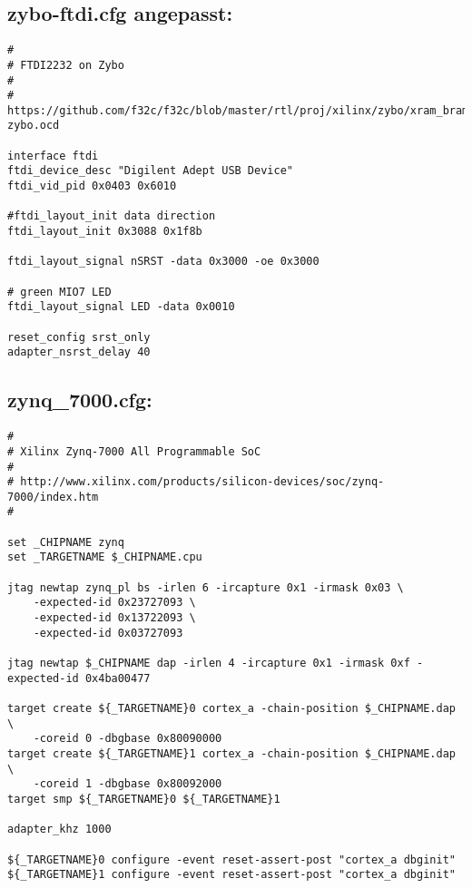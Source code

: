 \subsection{zybo-ftdi.cfg angepasst:}
\label{anhang:zybo-ftdi.cfg}
\lstset{language=tcl}
\begin{lstlisting}
#
# FTDI2232 on Zybo
#
#  https://github.com/f32c/f32c/blob/master/rtl/proj/xilinx/zybo/xram_bram_hdmi_ise/ftdi-zybo.ocd 

interface ftdi
ftdi_device_desc "Digilent Adept USB Device"
ftdi_vid_pid 0x0403 0x6010

#ftdi_layout_init data direction
ftdi_layout_init 0x3088 0x1f8b

ftdi_layout_signal nSRST -data 0x3000 -oe 0x3000

# green MIO7 LED
ftdi_layout_signal LED -data 0x0010

reset_config srst_only
adapter_nsrst_delay 40
\end{lstlisting}



\subsection{zynq\_7000.cfg:}
\label{anhang:zynq_7000.cfg}
\lstset{language=tcl}
\begin{lstlisting}
#
# Xilinx Zynq-7000 All Programmable SoC
#
# http://www.xilinx.com/products/silicon-devices/soc/zynq-7000/index.htm
#

set _CHIPNAME zynq
set _TARGETNAME $_CHIPNAME.cpu

jtag newtap zynq_pl bs -irlen 6 -ircapture 0x1 -irmask 0x03 \
    -expected-id 0x23727093 \
    -expected-id 0x13722093 \
    -expected-id 0x03727093

jtag newtap $_CHIPNAME dap -irlen 4 -ircapture 0x1 -irmask 0xf -expected-id 0x4ba00477

target create ${_TARGETNAME}0 cortex_a -chain-position $_CHIPNAME.dap \
    -coreid 0 -dbgbase 0x80090000
target create ${_TARGETNAME}1 cortex_a -chain-position $_CHIPNAME.dap \
    -coreid 1 -dbgbase 0x80092000
target smp ${_TARGETNAME}0 ${_TARGETNAME}1

adapter_khz 1000

${_TARGETNAME}0 configure -event reset-assert-post "cortex_a dbginit"
${_TARGETNAME}1 configure -event reset-assert-post "cortex_a dbginit"
\end{lstlisting}



